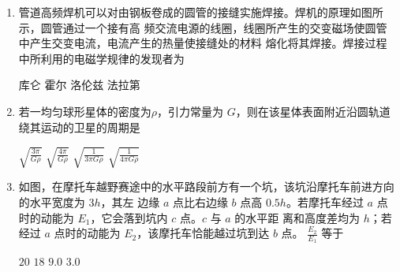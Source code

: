 


\gaokaoxz


\begin{enumerate}
\item
管道高频焊机可以对由钢板卷成的圆管的接缝实施焊接。焊机的原理如图所示，圆管通过一个接有高
频交流电源的线圈，线圈所产生的交变磁场使圆管中产生交变电流，电流产生的热量使接缝处的材料
熔化将其焊接。焊接过程中所利用的电磁学规律的发现者为  
\begin{figure}[h!]
\centering

\end{figure}


\fourchoices
{库仑}
{霍尔}
{洛伦兹}
{法拉第}




\item
若一均匀球形星体的密度为$ \rho $，引力常量为 $ G $，则在该星体表面附近沿圆轨道绕其运动的卫星的周期是  

\fourchoices
{$\sqrt{\frac{3 \pi}{G \rho}}$}
{$ \sqrt{\frac{4 \pi}{G \rho}}$}
{$ \sqrt{\frac{1}{3 \pi G \rho}}$}
{$\sqrt{\frac{1}{4 \pi G \rho}}$}



\item
如图，在摩托车越野赛途中的水平路段前方有一个坑，该坑沿摩托车前进方向的水平宽度为 $ 3h $，其左
边缘 $ a $ 点比右边缘 $ b $ 点高 $ 0.5h $。若摩托车经过 $ a $ 点时的动能为 $ E_{1} $，它会落到坑内 $ c $ 点。$ c $ 与 $ a $ 的水平距
离和高度差均为 $ h $；若经过 $ a $ 点时的动能为 $ E_{2} $，该摩托车恰能越过坑到达 $ b $ 点。
$\frac{E_{2}}{E_{1}}$
等于  
\begin{figure}[h!]
\centering

\end{figure}


\fourchoices
{$ 20 $}
{$ 18 $}
{$ 9.0 $}
{$ 3.0 $}





\end{enumerate}
